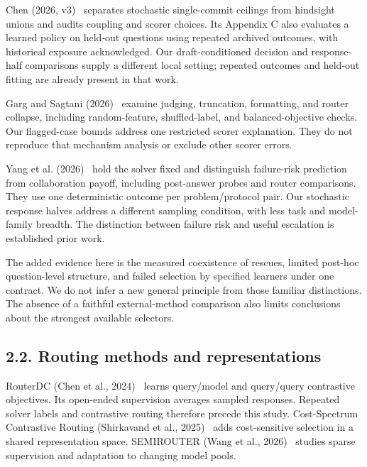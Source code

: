 \documentclass[11pt,a4paper]{article}
\begin{document}
Chen (2026, v3)~\citep{chen2026routingoracle} separates stochastic single-commit ceilings from hindsight unions and audits coupling and scorer choices. Its Appendix C also evaluates a learned policy on held-out questions using repeated archived outcomes, with historical exposure acknowledged. Our draft-conditioned decision and response-half comparisons supply a different local setting; repeated outcomes and held-out fitting are already present in that work.

Garg and Sagtani (2026)~\citep{garg2026unsolvability} examine judging, truncation, formatting, and router collapse, including random-feature, shuffled-label, and balanced-objective checks. Our flagged-case bounds address one restricted scorer explanation. They do not reproduce that mechanism analysis or exclude other scorer errors.

Yang et al. (2026)~\citep{yang2026failureprotocol} hold the solver fixed and distinguish failure-risk prediction from collaboration payoff, including post-answer probes and router comparisons. They use one deterministic outcome per problem/protocol pair. Our stochastic response halves address a different sampling condition, with less task and model-family breadth. The distinction between failure risk and useful escalation is established prior work.

The added evidence here is the measured coexistence of rescues, limited post-hoc question-level structure, and failed selection by specified learners under one contract. We do not infer a new general principle from those familiar distinctions. The absence of a faithful external-method comparison also limits conclusions about the strongest available selectors.

\subsection*{2.2. Routing methods and representations}\label{sec:22-routing-methods-and-representations}
RouterDC (Chen et al., 2024)~\citep{chen2024routerdc} learns query/model and query/query contrastive objectives. Its open-ended supervision averages sampled responses. Repeated solver labels and contrastive routing therefore precede this study. Cost-Spectrum Contrastive Routing (Shirkavand et al., 2025)~\citep{shirkavand2025cscr} adds cost-sensitive selection in a shared representation space. SEMIROUTER (Wang et al., 2026)~\citep{wang2026semirouter} studies sparse supervision and adaptation to changing model pools.
\end{document}
